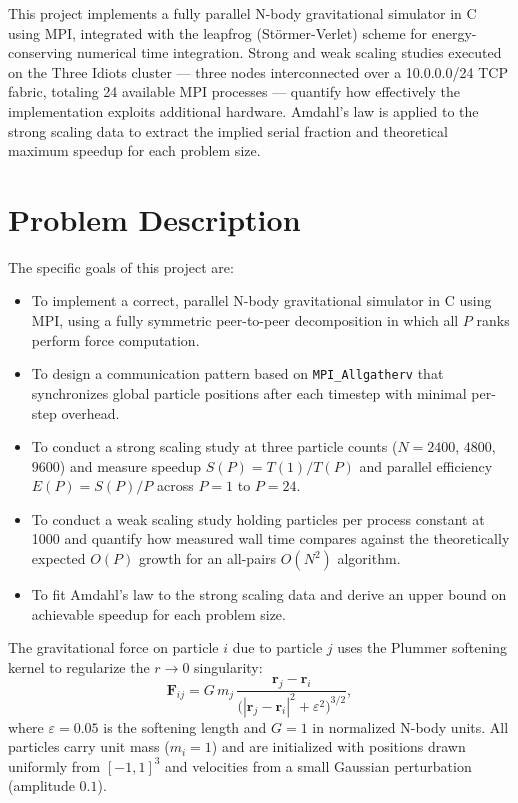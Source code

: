 \documentclass[11pt]{article}
\begin{document}
This project implements a fully parallel N-body gravitational simulator in C using MPI, integrated with the leapfrog (Störmer-Verlet) scheme for energy-conserving numerical time integration. Strong and weak scaling studies executed on the Three Idiots cluster — three nodes interconnected over a 10.0.0.0/24 TCP fabric, totaling 24 available MPI processes — quantify how effectively the implementation exploits additional hardware. Amdahl's law is applied to the strong scaling data to extract the implied serial fraction and theoretical maximum speedup for each problem size.

\section{Problem Description}

The specific goals of this project are:
\begin{itemize}
  \item To implement a correct, parallel N-body gravitational simulator in C using MPI, using a fully symmetric peer-to-peer decomposition in which all $P$ ranks perform force computation.
  \item To design a communication pattern based on \texttt{MPI\_Allgatherv} that synchronizes global particle positions after each timestep with minimal per-step overhead.
  \item To conduct a strong scaling study at three particle counts ($N = 2400$, $4800$, $9600$) and measure speedup $S(P) = T(1)/T(P)$ and parallel efficiency $E(P) = S(P)/P$ across $P = 1$ to $P = 24$.
  \item To conduct a weak scaling study holding particles per process constant at 1000 and quantify how measured wall time compares against the theoretically expected $O(P)$ growth for an all-pairs $O(N^2)$ algorithm.
  \item To fit Amdahl's law to the strong scaling data and derive an upper bound on achievable speedup for each problem size.
\end{itemize}

The gravitational force on particle $i$ due to particle $j$ uses the Plummer softening kernel to regularize the $r \to 0$ singularity:
\begin{equation}
  \mathbf{F}_{ij} = G \, m_j \, \frac{\mathbf{r}_j - \mathbf{r}_i}{\bigl(|\mathbf{r}_j - \mathbf{r}_i|^2 + \varepsilon^2\bigr)^{3/2}},
\end{equation}
where $\varepsilon = 0.05$ is the softening length and $G = 1$ in normalized N-body units. All particles carry unit mass ($m_i = 1$) and are initialized with positions drawn uniformly from $[-1, 1]^3$ and velocities from a small Gaussian perturbation (amplitude $0.1$).
\end{document}
